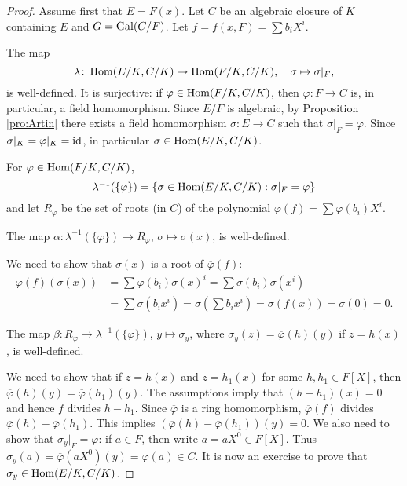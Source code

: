 \begin{proof}
    Assume first that $E=F(x)$. 
    Let $C$ be an algebraic closure of $K$ containing $E$ 
    and $G=\operatorname{Gal}(C/F)$. Let $f=f(x,F)=\sum b_iX^i$.
    
    The map
    \[
    \lambda\colon \operatorname{Hom}(E/K,C/K)\to\operatorname{Hom}(F/K,C/K),\quad
    \sigma\mapsto\sigma|_F,
    \]
    is well-defined. 
    It is surjective: 
    if $\varphi\in\operatorname{Hom}(F/K,C/K)$, then $\varphi\colon F\to C$ is, 
    in particular, a field homomorphism. Since $E/F$ is algebraic, by Proposition \ref{pro:Artin} 
    there exists a field homomorphism 
    $\sigma\colon E\to C$ such that $\sigma|_F=\varphi$. Since $\sigma|_K=\varphi|_K=\operatorname{id}$, in particular 
    $\sigma\in\operatorname{Hom}(E/K,C/K)$. 
    
    For $\varphi\in\operatorname{Hom}(F/K,C/K)$,  
    \[
    \lambda^{-1}(\{\varphi\})=\{\sigma\in\operatorname{Hom}(E/K,C/K):\sigma|_F=\varphi\}
    \]
    and let $R_\varphi$ be the set of roots (in $C$) of the polynomial $\overline{\varphi}(f)=\sum\varphi(b_i)X^i$. 
    
    \begin{claim}
        The map $\alpha\colon \lambda^{-1}(\{\varphi\})\to R_{\varphi}$, $\sigma\mapsto\sigma(x)$, is well-defined. 
    \end{claim}
    
    We need to show that $\sigma(x)$ is a root of $\overline{\varphi}(f)$:
    \begin{align*}
    \overline{\varphi}(f)(\sigma(x))&=\sum \varphi(b_i)\sigma(x)^i
    =\sum\sigma(b_i)\sigma(x^i)\\
    &=\sum\sigma(b_ix^i)=\sigma\left(\sum b_ix^i\right)=\sigma(f(x))=\sigma(0)=0.
    \end{align*}
    
    \begin{claim}
    The map $\beta\colon R_{\varphi}\to \lambda^{-1}(\{\varphi\})$, $y\mapsto\sigma_y$, 
    where $\sigma_y(z)=\overline{\varphi}(h)(y)$
    if $z=h(x)$, is well-defined. 
    \end{claim}
    
    We need to show that if $z=h(x)$ and 
    $z=h_1(x)$ for some $h,h_1\in F[X]$, then 
    $\overline{\varphi}(h)(y)=\overline{\varphi}(h_1)(y)$. 
    The assumptions imply that 
    $(h-h_1)(x)=0$ and hence $f$ divides $h-h_1$. Since
    $\overline{\varphi}$ is a ring homomorphism, 
    $\overline{\varphi}(f)$ divides $\overline{\varphi}(h)-\overline{\varphi}(h_1)$. 
    This implies $(\overline{\varphi}(h)-\overline{\varphi}(h_1))(y)=0$. We also need to show that 
    $\sigma_y|_F=\varphi$: if $a\in F$, then 
    write $a=aX^0\in F[X]$. Thus 
    $\sigma_y(a)=\overline{\varphi}(aX^0)(y)=\varphi(a)\in C$. 
    It is now an exercise to prove that $\sigma_y\in\operatorname{Hom}(E/K,C/K)$. 
    

\end{proof}
